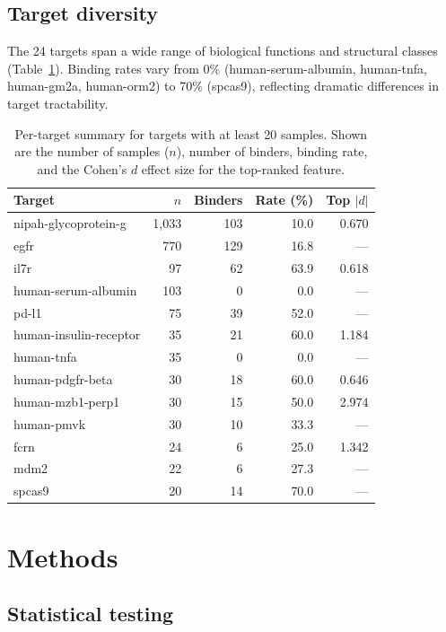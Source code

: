\documentclass[11pt,a4paper]{article}
\begin{document}
\subsection{Target diversity}

The 24 targets span a wide range of biological functions and structural classes (Table~\ref{tab:targets}).
Binding rates vary from 0\% (human-serum-albumin, human-tnfa, human-gm2a, human-orm2) to 70\% (spcas9), reflecting dramatic differences in target tractability.

\begin{table}[H]
\centering
\caption{Per-target summary for targets with at least 20 samples. Shown are the number of samples ($n$), number of binders, binding rate, and the Cohen's $d$ effect size for the top-ranked feature.}
\label{tab:targets}
\begin{tabular}{lrrrr}
\toprule
Target & $n$ & Binders & Rate (\%) & Top $|d|$ \\
\midrule
nipah-glycoprotein-g & 1,033 & 103 & 10.0 & 0.670 \\
egfr & 770 & 129 & 16.8 & --- \\
il7r & 97 & 62 & 63.9 & 0.618 \\
human-serum-albumin & 103 & 0 & 0.0 & --- \\
pd-l1 & 75 & 39 & 52.0 & --- \\
human-insulin-receptor & 35 & 21 & 60.0 & 1.184 \\
human-tnfa & 35 & 0 & 0.0 & --- \\
human-pdgfr-beta & 30 & 18 & 60.0 & 0.646 \\
human-mzb1-perp1 & 30 & 15 & 50.0 & 2.974 \\
human-pmvk & 30 & 10 & 33.3 & --- \\
fcrn & 24 & 6 & 25.0 & 1.342 \\
mdm2 & 22 & 6 & 27.3 & --- \\
spcas9 & 20 & 14 & 70.0 & --- \\
\bottomrule
\end{tabular}
\end{table}

\section{Methods}

\subsection{Statistical testing}
\end{document}
